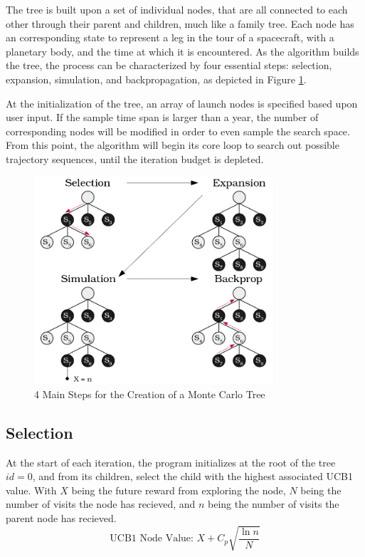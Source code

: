 \documentclass[letterpaper, preprint, paper,11pt]{AAS}	%
\begin{document}
The tree is built upon a set of individual nodes, that are all connected to each other through their parent and children, much like a family tree. Each node has an corresponding state to represent a leg in the tour of a spacecraft, with a planetary body, and the time at which it is encountered. As the algorithm builds the tree, the process can be characterized by four essential steps: selection, expansion, simulation, and backpropagation, as depicted in Figure \ref*{fig:mctsFunc}. 

At the initialization of the tree, an array of launch nodes is specified based upon user input. If the sample time span is larger than a year, the number of corresponding nodes will be modified in order to even sample the search space. From this point, the algorithm will begin its core loop to search out possible trajectory sequences, until the iteration budget is depleted. 


\begin{figure}[htb]
	\centering\includegraphics[width=3.5in]{fig/mctsFuncs.png}
	\caption{4 Main Steps for the Creation of a Monte Carlo Tree}
	\label{fig:mctsFunc}
\end{figure}

\subsection{Selection} 
At the start of each iteration, the program initializes at the root of the tree $id = 0$, and from its children, select the child with the highest associated UCB1 value. With $X$ being the future reward from exploring the node, $N$ being the number of visits the node has recieved, and $n$ being the number of visits the parent node has recieved. 
\begin{equation}
    \label{eq:UCB1}
    \text{UCB1 Node Value: } X + C_p \sqrt{\frac{\ln{n}}{N}}
\end{equation}
\end{document}
